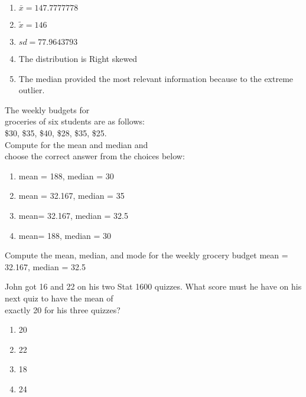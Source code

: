 \documentclass[11pt]{book}\usepackage[]{graphicx}\usepackage[]{color}
\begin{document}
\begin{exercises}
\begin{solution}
\begin{enumerate}
\item $\bar{x} = 147.7777778$
\item $\tilde{x} = 146$
\item $sd = 77.9643793 $
\item The distribution is Right skewed
\item The median provided the most relevant information because to the extreme outlier.
\end{enumerate}

\end{solution}

% 
  \begin{exercise} %

  The weekly budgets for \\ groceries of six students are as follows: \\
\$30, \$35, \$40, \$28, \$35, \$25. \\ Compute for the mean and median and \\ choose the correct answer from the choices below:
	\begin{enumerate}
	\item mean = 188, median = 30
	\item mean = 32.167, median = 35
	\item mean= 32.167, median = 32.5
	\item mean= 188, median = 30
	\end{enumerate}

	\vspace{5mm}
	\end{exercise}
	\vspace{2mm}
	\begin{solution}   %

	Compute the mean, median, and mode for the weekly grocery budget
	mean = 32.167, median = 32.5

	\end{solution}

  \begin{exercise} %

  John got 16 and 22 on his two Stat 1600 quizzes.  What score must he have on his next quiz to have the mean of \\ exactly 20 for his three quizzes?
	\begin{enumerate}
	\item 20
	\item 22
	\item 18
	\item 24
	\end{enumerate}


\end{exercise}
\end{exercises}
\end{document}
